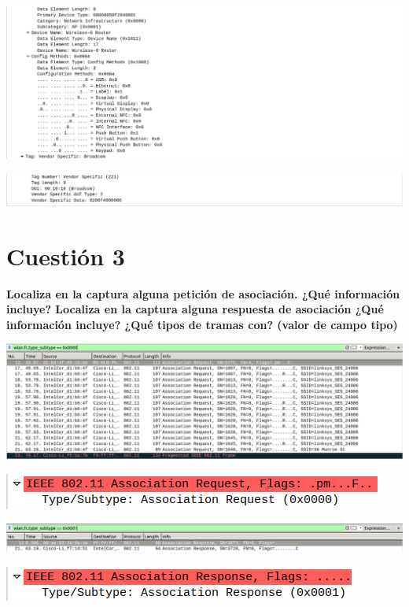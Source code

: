 \documentclass{article}
\begin{document}
\begin{center}
\includegraphics[scale=0.3]{WLAN/probres9.png}
\end{center}
\begin{center}
\includegraphics[scale=0.3]{WLAN/probres10.png}
\end{center}


\section{Cuestión 3}

\textbf{Localiza en la captura alguna petición de asociación. ¿Qué información incluye?
Localiza en la captura alguna respuesta de asociación ¿Qué información incluye? ¿Qué tipos de
tramas con? (valor de campo tipo)}

\begin{center}
\includegraphics[scale=0.3]{WLAN/assreq.png}
\end{center}
\begin{center}
\includegraphics[scale=0.4]{WLAN/assreqt.png}
\end{center}

\begin{center}
\includegraphics[scale=0.3]{WLAN/assres.png}
\end{center}
\begin{center}
\includegraphics[scale=0.4]{WLAN/assrest.png}
\end{center}
\end{document}
